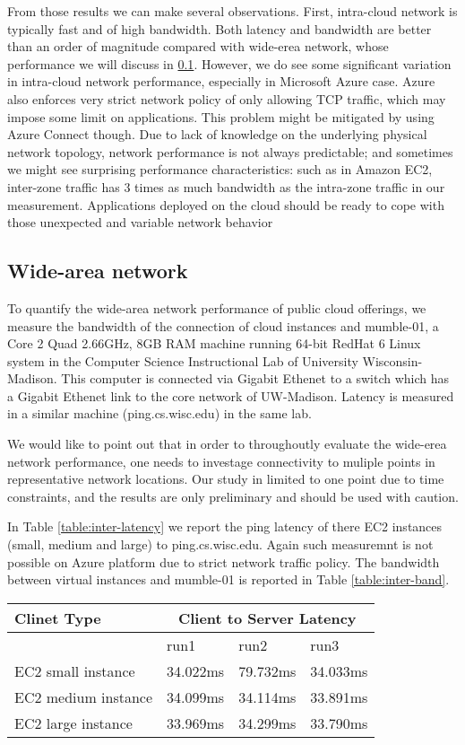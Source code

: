 From those results we can make several observations. First, intra-cloud network is typically fast and of high bandwidth. Both latency and bandwidth are better than an order of magnitude compared with wide-erea network, whose performance we will discuss in \ref{subsection:widearea}. However, we do see some significant variation in intra-cloud network performance, especially in Microsoft Azure case. Azure also enforces very strict network policy of only allowing TCP traffic, which may impose some limit on applications. This problem might be mitigated by using Azure Connect though. Due to lack of knowledge on the underlying physical network topology, network performance is not always predictable; and sometimes we might see surprising performance characteristics: such as in Amazon EC2, inter-zone traffic has 3 times as much bandwidth as the intra-zone traffic in our measurement. Applications deployed on the cloud should be ready to cope with those unexpected and variable network behavior


\subsection{Wide-area network}
\label{subsection:widearea}
To quantify the wide-area network performance of public cloud offerings, we measure the bandwidth of the connection of cloud instances and mumble-01, a Core 2 Quad 2.66GHz, 8GB RAM machine running 64-bit RedHat 6 Linux system in the Computer Science Instructional Lab of University Wisconsin-Madison. This computer is connected via Gigabit Ethenet to a switch which has a Gigabit Ethenet link to the core network of UW-Madison. Latency is measured in a similar machine (ping.cs.wisc.edu) in the same lab.

We would like to point out that in order to throughoutly evaluate the wide-erea network performance, one needs to investage connectivity to muliple points in representative network locations. Our study in limited to one point due to time constraints, and the results are only preliminary and should be used with caution.

In Table \ref{table:inter-latency} we report the ping latency of there EC2 instances (small, medium and large) to ping.cs.wisc.edu. Again such measuremnt is not possible on Azure platform due to strict network traffic policy. The bandwidth between virtual instances and mumble-01 is reported in Table \ref{table:inter-band}.

\begin{table*}
\center
  \begin{tabular} {| l | l | l| l |}
\hline
Clinet Type & \multicolumn{3}{|c|}{Client to Server Latency} \\
\hline
& run1 & run2 & run3 \\
\hline
EC2 small instance & 34.022ms & 79.732ms & 34.033ms\\
EC2 medium instance & 34.099ms & 34.114ms & 33.891ms \\
EC2 large instance & 33.969ms & 34.299ms & 33.790ms \\
\hline
\end{tabular}
\caption{Wide-erea network latency measurement}
\label{table:inter-latency}
\end{table*}


